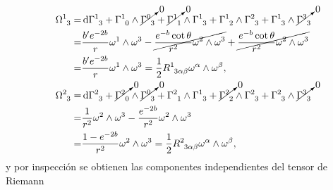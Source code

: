 \begin{subequations}
\begin{align}
        \tensor{\Omega}{^1_3}=&\dd{\tensor{\Gamma}{^1_3}}+\tensor{\Gamma}{^1_0}\wedge\cancelto{0}{\tensor{\Gamma}{^0_3}}+\cancelto{0}{\tensor{\Gamma}{^1_1}}\wedge\tensor{\Gamma}{^1_3}+\tensor{\Gamma}{^1_2}\wedge\tensor{\Gamma}{^2_3}+\tensor{\Gamma}{^1_3}\wedge\cancelto{0}{\tensor{\Gamma}{^3_3}} \nonumber \\
        =& \frac{b^\prime e^{-2b}}{r}\omega^1\wedge\omega^3-\cancel{\frac{e^{-b}\cot{\theta}}{r^2}\omega^2\wedge\omega^3}+\cancel{\frac{e^{-b}\cot{\theta}}{r^2}\omega^2\wedge\omega^3} \nonumber \\
        =& \frac{b^\prime e^{-2b}}{r}\omega^1\wedge\omega^3 = \frac{1}{2}\tensor{R}{^1_3_\alpha_\beta}\omega^\alpha\wedge\omega^\beta, \\
        \tensor{\Omega}{^2_3}=&\dd{\tensor{\Gamma}{^2_3}}+\cancelto{0}{\tensor{\Gamma}{^2_0}}\wedge\cancelto{0}{\tensor{\Gamma}{^0_3}}+\tensor{\Gamma}{^2_1}\wedge\tensor{\Gamma}{^1_3}+\cancelto{0}{\tensor{\Gamma}{^2_2}}\wedge\tensor{\Gamma}{^2_3}+\tensor{\Gamma}{^2_3}\wedge\cancelto{0}{\tensor{\Gamma}{^3_3}} \nonumber \\
        =& \frac{1}{r^2}\omega^2\wedge\omega^3-\frac{e^{-2b}}{r^2}\omega^2\wedge\omega^3 \nonumber \\
        =& \frac{1-e^{-2b}}{r^2}\omega^2\wedge\omega^3 = \frac{1}{2}\tensor{R}{^2_3_\alpha_\beta}\omega^\alpha\wedge\omega^\beta,
    \end{align}
\end{subequations}
\endgroup
y por inspección se obtienen las componentes independientes del tensor de Riemann

